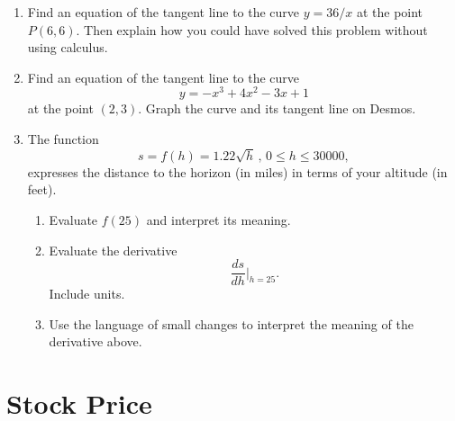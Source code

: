 \documentclass{ximera}
\begin{document}
\begin{question}  \label{Qdsfsdfre}
\begin{enumerate}

\item Find an equation of the tangent line to the curve $y=36/x$ at the point $P(6,6)$. Then explain how you could have solved this problem without using calculus.

\item Find an equation of the tangent line to the curve
\[
      y = -x^3 + 4x^2 -3x + 1
\] 
at the point $(2,3)$. Graph the curve and its tangent line on Desmos. 

\item The function
\[
     s = f(h) = 1.22 \sqrt{h} \, , \, 0\leq h \leq 30000 ,
\]
expresses the distance to the horizon (in miles) in terms of your altitude (in feet).

\begin{enumerate}
\item Evaluate $f(25)$ and interpret its meaning.

\item Evaluate the derivative 
\[
    \frac{ds}{dh}\Big|_{h=25} .
\]
Include units.

\item Use the language of small changes to interpret the meaning of the derivative above.

\end{enumerate}

\end{enumerate}
\end{question}





\section{Stock Price}
\end{document}

